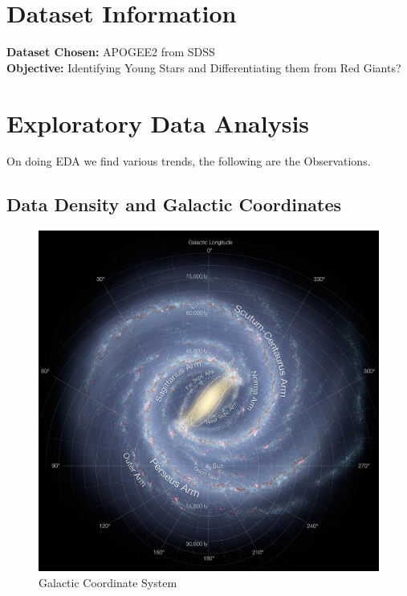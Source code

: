 \documentclass{article}
\begin{document}
\section{Dataset Information}\label{dataset-information}

\textbf{Dataset Chosen:}
 APOGEE2 from SDSS\\
\textbf{Objective:}
Identifying Young Stars and Differentiating them from Red Giants?\\
\section{Exploratory Data Analysis} On doing EDA we find various trends, the
following are the Observations.\\
\subsection{Data Density and Galactic Coordinates}
\begin{figure}[H]
   \centering
   \label{fig:1}
   \includegraphics[width=\textwidth]{Images/GalacticCoordinates.jpg}
   \caption{Galactic Coordinate System}
\end{figure}
\end{document}
